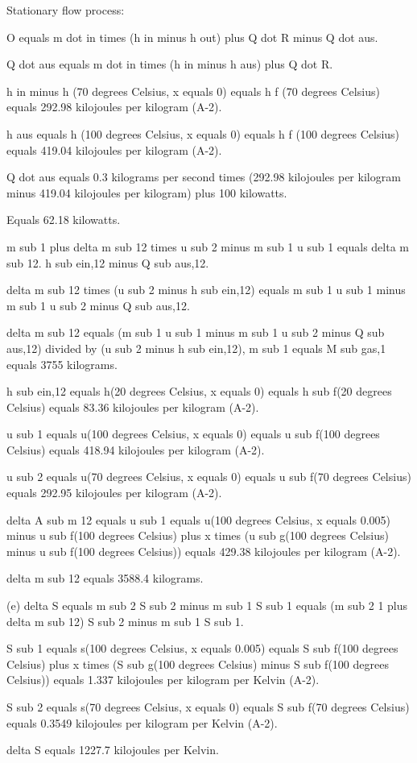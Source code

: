 Stationary flow process:

O equals m dot in times (h in minus h out) plus Q dot R minus Q dot aus.

Q dot aus equals m dot in times (h in minus h aus) plus Q dot R.

h in minus h (70 degrees Celsius, x equals 0) equals h f (70 degrees Celsius) equals 292.98 kilojoules per kilogram (A-2).

h aus equals h (100 degrees Celsius, x equals 0) equals h f (100 degrees Celsius) equals 419.04 kilojoules per kilogram (A-2).

Q dot aus equals 0.3 kilograms per second times (292.98 kilojoules per kilogram minus 419.04 kilojoules per kilogram) plus 100 kilowatts.

Equals 62.18 kilowatts.

m sub 1 plus delta m sub 12 times u sub 2 minus m sub 1 u sub 1 equals delta m sub 12. h sub ein,12 minus Q sub aus,12.

delta m sub 12 times (u sub 2 minus h sub ein,12) equals m sub 1 u sub 1 minus m sub 1 u sub 2 minus Q sub aus,12.

delta m sub 12 equals (m sub 1 u sub 1 minus m sub 1 u sub 2 minus Q sub aus,12) divided by (u sub 2 minus h sub ein,12), m sub 1 equals M sub gas,1 equals 3755 kilograms.

h sub ein,12 equals h(20 degrees Celsius, x equals 0) equals h sub f(20 degrees Celsius) equals 83.36 kilojoules per kilogram (A-2).

u sub 1 equals u(100 degrees Celsius, x equals 0) equals u sub f(100 degrees Celsius) equals 418.94 kilojoules per kilogram (A-2).

u sub 2 equals u(70 degrees Celsius, x equals 0) equals u sub f(70 degrees Celsius) equals 292.95 kilojoules per kilogram (A-2).

delta A sub m 12 equals u sub 1 equals u(100 degrees Celsius, x equals 0.005) minus u sub f(100 degrees Celsius) plus x times (u sub g(100 degrees Celsius) minus u sub f(100 degrees Celsius)) equals 429.38 kilojoules per kilogram (A-2).

delta m sub 12 equals 3588.4 kilograms.

(e) delta S equals m sub 2 S sub 2 minus m sub 1 S sub 1 equals (m sub 2 1 plus delta m sub 12) S sub 2 minus m sub 1 S sub 1.

S sub 1 equals s(100 degrees Celsius, x equals 0.005) equals S sub f(100 degrees Celsius) plus x times (S sub g(100 degrees Celsius) minus S sub f(100 degrees Celsius)) equals 1.337 kilojoules per kilogram per Kelvin (A-2).

S sub 2 equals s(70 degrees Celsius, x equals 0) equals S sub f(70 degrees Celsius) equals 0.3549 kilojoules per kilogram per Kelvin (A-2).

delta S equals 1227.7 kilojoules per Kelvin.